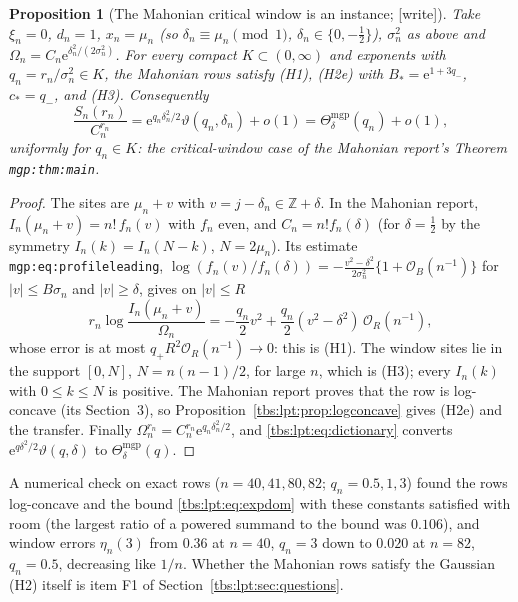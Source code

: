 \documentclass[11pt,a4paper]{article}
\numberwithin{equation}{section}
\newtheorem{proposition}[theorem]{Proposition}
\theoremstyle{definition}
\newcommand{\Z}{\mathbb Z}
\newcommand{\ee}{\mathrm e}
\newcommand{\OO}{\mathcal O}
\newcommand{\code}[1]{\texttt{#1}}
\begin{document}
\begin{proposition}[The Mahonian critical window is an instance; {[write]}]\label{tbs:lpt:prop:mahonian}
Take $\xi_n=0$, $d_n=1$, $x_n=\mu_n$ (so $\delta_n\equiv\mu_n\pmod1$,
$\delta_n\in\{0,-\frac12\}$), $\sigma_n^2$ as above and
$\Omega_n=C_n\ee^{\delta_n^2/(2\sigma_n^2)}$. For every compact
$K\subset(0,\infty)$ and exponents with $q_n=r_n/\sigma_n^2\in K$, the
Mahonian rows satisfy (H1), (H2e) with $B_*=\ee^{1+3q_-}$, $c_*=q_-$,
and (H3). Consequently
\[
 \frac{S_n(r_n)}{C_n^{r_n}}
 =\ee^{q_n\delta_n^2/2}\vartheta(q_n,\delta_n)+o(1)
 =\Theta^{\mathrm{mgp}}_{\delta}(q_n)+o(1),
\]
uniformly for $q_n\in K$: the critical-window case of the Mahonian
report's Theorem \code{mgp:thm:main}.
\end{proposition}

\begin{proof}
The sites are $\mu_n+v$ with $v=j-\delta_n\in\Z+\delta$. In the Mahonian
report, $I_n(\mu_n+v)=n!\,f_n(v)$ with $f_n$ even, and $C_n=n!f_n(\delta)$
(for $\delta=\frac12$ by the symmetry $I_n(k)=I_n(N-k)$, $N=2\mu_n$). Its
estimate \code{mgp:eq:profileleading},
$\log(f_n(v)/f_n(\delta))=-\frac{v^2-\delta^2}{2\sigma_n^2}\{1+\OO_B(n^{-1})\}$
for $|v|\le B\sigma_n$ and $|v|\ge\delta$, gives on $|v|\le R$
\[
 r_n\log\frac{I_n(\mu_n+v)}{\Omega_n}
 =-\frac{q_n}{2}v^2+\frac{q_n}2(v^2-\delta^2)\,\OO_R(n^{-1}),
\]
whose error is at most $q_+R^2\OO_R(n^{-1})\to0$: this is (H1). The
window sites lie in the support $[0,N]$, $N=n(n-1)/2$, for large $n$,
which is (H3); every $I_n(k)$ with $0\le k\le N$ is positive. The
Mahonian report proves that the row is log-concave (its Section~3), so
Proposition~\ref{tbs:lpt:prop:logconcave} gives (H2e) and the transfer.
Finally $\Omega_n^{r_n}=C_n^{r_n}\ee^{q_n\delta_n^2/2}$, and
\eqref{tbs:lpt:eq:dictionary} converts $\ee^{q\delta^2/2}\vartheta(q,\delta)$
to $\Theta^{\mathrm{mgp}}_\delta(q)$.
\end{proof}

A numerical check on exact rows ($n=40,41,80,82$; $q_n=0.5,1,3$) found the
rows log-concave and the bound \eqref{tbs:lpt:eq:expdom} with these
constants satisfied with room (the largest ratio of a powered summand to
the bound was $0.106$), and window errors $\eta_n(3)$ from $0.36$ at
$n=40$, $q_n=3$ down to $0.020$ at $n=82$, $q_n=0.5$, decreasing like
$1/n$. Whether the Mahonian rows satisfy the Gaussian (H2) itself is
item F1 of Section~\ref{tbs:lpt:sec:questions}.
\end{document}
